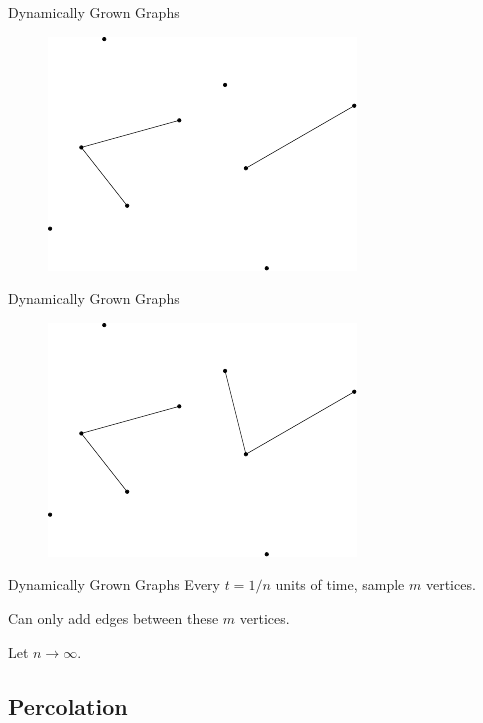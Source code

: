 \documentclass{beamer}
\begin{document}
\begin{frame}{Dynamically Grown Graphs}
        \begin{figure}[H]
                \centering
                \includegraphics[scale=1]{fig/graph-4.pdf}
        \end{figure}
\end{frame}
\begin{frame}{Dynamically Grown Graphs}
        \begin{figure}[H]
                \centering
                \includegraphics[scale=1]{fig/graph-5.pdf}
        \end{figure}
\end{frame}

\begin{frame}{Dynamically Grown Graphs}
	Every $t=1/n$ units of time, sample $m$ vertices.
	\vspace{5mm}

	Can only add edges between these $m$ vertices.
	\vspace{5mm}

	\pause
	Let $n\to \infty$.
\end{frame}

\subsection{Percolation}
\end{document}
